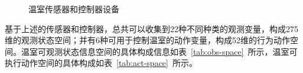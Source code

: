 \begin{figure}[hbp]
{    }
    \caption{温室传感器和控制器设备}
    \label{fig:devices}
\end{figure}

基于上述的传感器和控制器，总共可以收集到22种不同种类的观测变量，构成275维的观测状态空间；并有6种可用于控制温室的动作变量，构成52维的行为动作空间。温室可观测状态信息空间的具体构成信息如表~\ref{tab:obs-space}~所示，温室可执行动作空间的具体构成如表~\ref{tab:act-space}~所示。

